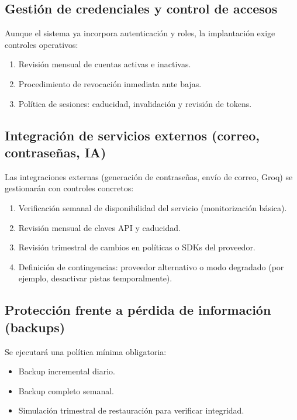 \subsection{Gestión de credenciales y control de accesos}

Aunque el sistema ya incorpora autenticación y roles, la implantación exige controles operativos:

\begin{enumerate}
    \item Revisión mensual de cuentas activas e inactivas.
    \item Procedimiento de revocación inmediata ante bajas.
    \item Política de sesiones: caducidad, invalidación y revisión de tokens.
\end{enumerate}

\subsection{Integración de servicios externos (correo, contraseñas, IA)}

Las integraciones externas (generación de contraseñas, envío de correo, Groq) se gestionarán con controles concretos:

\begin{enumerate}
    \item Verificación semanal de disponibilidad del servicio (monitorización básica).
    \item Revisión mensual de claves API y caducidad.
    \item Revisión trimestral de cambios en políticas o SDKs del proveedor.
    \item Definición de contingencias: proveedor alternativo o modo degradado (por ejemplo, desactivar pistas temporalmente).
\end{enumerate}

\subsection{Protección frente a pérdida de información (backups)}

Se ejecutará una política mínima obligatoria:

\begin{itemize}
    \item Backup incremental diario.
    \item Backup completo semanal.
    \item Simulación trimestral de restauración para verificar integridad.
\end{itemize}

